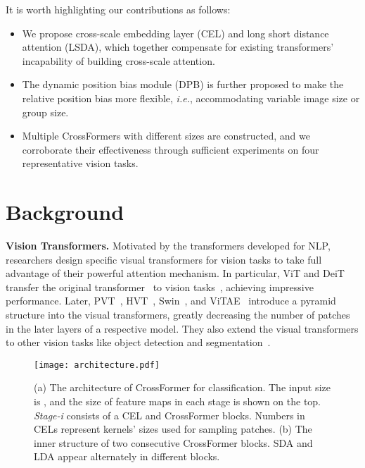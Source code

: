 \documentclass{article} \usepackage{iclr2022_conference,times}
\newcommand{\ie}{{\emph{i.e.}}}
\begin{document}
It is worth highlighting our contributions as follows:
\begin{itemize}[leftmargin=5mm]
    \vspace{-2mm}
    \item We propose cross-scale embedding layer (CEL) and long short distance attention (LSDA), which together compensate for existing transformers' incapability of building cross-scale attention.
\item The dynamic position bias module (DPB) is further proposed to make the relative position bias more flexible, \ie, accommodating variable image size or group size.
\item Multiple CrossFormers with different sizes are constructed, and we corroborate their effectiveness through sufficient experiments on four representative vision tasks.
\end{itemize}

\vspace{-3mm}
\section{Background}
\vspace{-2mm}

\textbf{Vision Transformers.} Motivated by the transformers developed for NLP, researchers design specific visual transformers for vision tasks to take full advantage of their powerful attention mechanism. In particular, ViT and DeiT transfer the original transformer~\cite{DBLP:conf/nips/VaswaniSPUJGKP17} to vision tasks~\citep{DBLP:conf/icml/TouvronCDMSJ21,DBLP:conf/iclr/DosovitskiyB0WZ21}, achieving impressive performance. Later, PVT~\citep{DBLP:journals/corr/abs-2102-12122}, HVT~\citep{DBLP:journals/corr/abs-2103-10619}, Swin~\citep{DBLP:journals/corr/abs-2103-14030}, and ViTAE~\citep{DBLP:journals/corr/abs-2106-03348} introduce a pyramid structure into the visual transformers, greatly decreasing the number of patches in the later layers of a respective model. They also extend the visual transformers to other vision tasks like object detection and segmentation~\citep{DBLP:journals/corr/abs-2102-12122,DBLP:journals/corr/abs-2103-14030}.

\begin{figure*}[tb]
    \centering
    \texttt{[image: architecture.pdf]}
    \caption{(a) The architecture of CrossFormer for classification. The input size is , and the size of feature maps in each stage is shown on the top. \textit{Stage-i} consists of a CEL and  CrossFormer blocks. Numbers in CELs represent kernels' sizes used for sampling patches. (b) The inner structure of two consecutive CrossFormer blocks. SDA and LDA appear alternately in different blocks.}
    \vspace{-4mm}
    \label{fig:arch}
\end{figure*}
\end{document}
